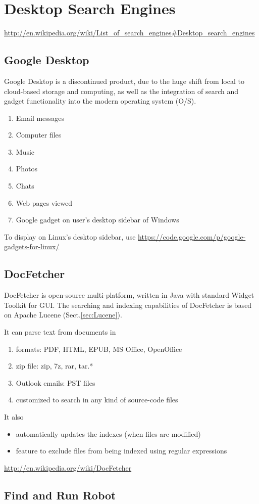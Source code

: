 \chapter{Desktop Search Engines}
\label{chap:Desktop_SearchEngine}

\url{http://en.wikipedia.org/wiki/List_of_search_engines\#Desktop_search_engines}

\section{Google Desktop}
\label{sec:Google_Desktop}

Google Desktop is a discontinued product, due to the huge shift from local to
cloud-based storage and computing, as well as the integration of search and
gadget functionality into the modern operating system (O/S).
\begin{enumerate}
  \item Email messages
  \item Computer files
  \item Music
  \item Photos
  \item Chats
  \item Web pages viewed
  \item Google gadget on user's desktop sidebar of Windows
\end{enumerate}

To display on Linux's desktop sidebar, use
\url{https://code.google.com/p/google-gadgets-for-linux/}

\section{DocFetcher}
\label{sec:DocFetcher}

DocFetcher is open-source multi-platform, written in Java with standard Widget
Toolkit for GUI. The searching and indexing capabilities of DocFetcher is based
on Apache Lucene (Sect.\ref{sec:Lucene}).

It can parse text from documents in
\begin{enumerate}
  \item formats: PDF, HTML, EPUB, MS Office, OpenOffice
  \item zip file: zip, 7z, rar, tar.*
  \item Outlook emails: PST files
  \item customized to search in any kind of source-code files
\end{enumerate}
It also 
\begin{itemize}
  \item automatically updates the indexes (when files are modified)
  \item feature to exclude files from being indexed using regular expressions
\end{itemize}


\url{http://en.wikipedia.org/wiki/DocFetcher}

\section{Find and Run Robot}